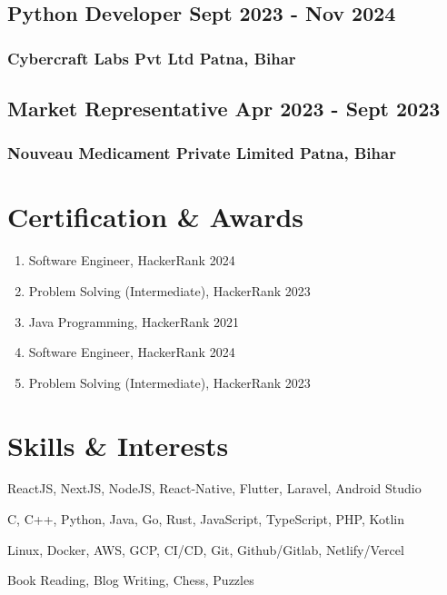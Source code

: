 \documentclass[11pt]{article} %
\begin{document}
\subsection{Python Developer \hfill Sept 2023 - Nov 2024}
\subsubsection{Cybercraft Labs Pvt Ltd \hfill Patna, Bihar}
\vspace{8pt}
\subsection{Market Representative \hfill Apr 2023 - Sept 2023}
\subsubsection{Nouveau Medicament Private Limited \hfill Patna, Bihar}

\vspace{18pt}

\section{Certification \& Awards}
\begin{enumerate}[label=\null, left=0pt..0pt, itemsep=0pt]
	\item Software Engineer, HackerRank \hfill 2024
	\item Problem Solving (Intermediate), HackerRank \hfill 2023
	\item Java Programming, HackerRank \hfill 2021
	\item Software Engineer, HackerRank \hfill 2024
	\item Problem Solving (Intermediate), HackerRank \hfill 2023
\end{enumerate}

\section{Skills \& Interests}
\begin{description}[itemsep=0pt]
	\item[Frameworks \& Stacks] ReactJS, NextJS, NodeJS, React-Native, Flutter, Laravel, Android Studio
	\item[Programming] C, C++, Python, Java, Go, Rust, JavaScript, TypeScript, PHP, Kotlin
	\item[DevOps] Linux, Docker, AWS, GCP, CI/CD, Git, Github/Gitlab, Netlify/Vercel
	\item[Interests] Book Reading, Blog Writing, Chess, Puzzles
\end{description}
\end{document}
